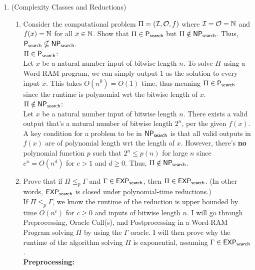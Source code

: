 \documentclass[11pt]{article}
\begin{document}
\begin{enumerate}
    \item (Complexity Classes and Reductions)  
    \begin{enumerate}
        \item Consider the computational problem $\Pi = (\mathcal{I},\mathcal{O},f)$ where $\mathcal{I}=\mathcal{O}=\mathbb{N}$ and $f(x)=\mathbb{N}$ for all $x\in \mathbb{N}$.  Show that $\Pi\in \mathsf{P_{search}}$ but $\Pi\notin \mathsf{NP_{search}}$.  Thus, $\mathsf{P_{search}}\nsubseteq\mathsf{NP_{search}}$. \\

        $\Pi \in \mathsf{P_{search}}$: \\

        Let $x$ be a natural number input of bitwise length $n$. To solve $\Pi$ using a Word-RAM program, we can simply output 1 as the solution to every input $x$. This takes $O(n^0) = O(1)$ time, thus meaning $\Pi \in \mathsf{P_{search}}$ since the runtime is polynomial wrt the bitwise length of $x$. \\

        $\Pi \notin \mathsf{NP_{search}}$: \\

        Let $x$ be a natural number input of bitwise length $n$. There exists a valid output that's a natural number of bitwise length $2^n$, per the given $f(x)$. A key condition for a problem to be in $\mathsf{NP_{search}}$ is that all valid outputs in $f(x)$ are of polynomial length wrt the length of $x$. However, there's \textbf{no} polynomial function $p$ such that $2^n \leq p(n)$ for large $n$ since $c^n = O(n^d)$ for $c>1$ and $d\geq0$. Thus, $\Pi \notin \mathsf{NP_{search}}$. \\
        
        \item  Prove that if 
$\Pi\leq_p \Gamma$ and $\Gamma\in \mathsf{EXP_{search}}$, then $\Pi\in \mathsf{EXP_{search}}$. (In other words, $\mathsf{EXP_{search}}$ is closed under polynomial-time reductions.) \\

If $\Pi\leq_p \Gamma$, we know the runtime of the reduction is upper bounded by time $O(n^c)$ for $c\geq0$ and inputs of bitwise length $n$. I will go through Preprocessing, Oracle Call(s), and Postprocessing in a Word-RAM Program solving $\Pi$ by using the $\Gamma$ oracle. I will then prove why the runtime of the algorithm solving $\Pi$ is exponential, assuming $\Gamma \in \mathsf{EXP_{search}}$. \\

\textbf{Preprocessing:} \\


\end{enumerate}
\end{enumerate}
\end{document}

